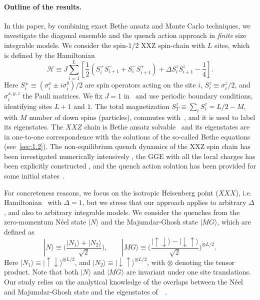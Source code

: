 \documentclass[11pt]{iopart}
\begin{document}
\paragraph*{Outline of the results.} 
In this paper, by combining exact Bethe ansatz and Monte Carlo techniques, we investigate 
the diagonal ensemble and the quench action approach in {\it finite} size integrable models. 
%
We consider the spin-$1/2$ XXZ spin-chain with $L$ sites, which is defined by the Hamiltonian 
%
\begin{equation}
\label{xxx-ham}
{\mathcal H}\equiv J\sum\limits_{i=1}^L\left[\frac{1}{2}(S_i^+S^-_{i+1} 
+S_i^{-}S_{i+1}^+)+\Delta S_i^zS_{i+1}^z-\frac{1}{4}\right].
\end{equation}
%
Here $S^{\pm}_i\equiv (\sigma_i^x\pm i\sigma_i^y)/2$ are spin operators acting on the 
site $i$, $S_i^z\equiv\sigma_i^z/2$, and $\sigma^{x,y,z}_i$ the Pauli matrices. We 
fix $J=1$ in~ and use periodic boundary conditions, identifying sites 
$L+1$ and $1$. The total magnetization $S_{T}^z\equiv\sum_iS_i^z=L/2-M$, with $M$ number 
of down spins (particles), commutes with~, and it is used to label its 
eigenstates. The $XXZ$ chain is Bethe ansatz solvable~\cite{bethe-1931,kor-book} and its eigenstates 
are in one-to-one correspondence with the solutions of the so-called Bethe equations 
(see~\ref{sec:1.2}). 
%
The non-equilibrium quench dynamics of the XXZ spin chain has been investigated 
numerically intensively \cite{dmcf-06,bar-09,krs-12,cbp-13,cce-15,fagotti-2014}, the GGE with all the 
local charges has been explicitly constructed \cite{fagotti-2014,pozsgay-2013,fagotti-2013b}, 
and the quench action solution has been provided for some initial states~\cite{pozsgay-2014A,wouters-2014A}. 

For concreteness reasons, we focus on the isotropic Heisenberg point ($XXX$), i.e. 
Hamiltonian~ with $\Delta=1$, but we stress that our approach applies to arbitrary 
$\Delta$, and  also to arbitrary integrable models. We consider the quenches from the zero-momentum 
N\'eel state $|N\rangle$ and the Majumdar-Ghosh state $|MG\rangle$, which are defined as  
%
\begin{equation}
\label{psi0}
|N\rangle\equiv\Big(\frac{|N_1\rangle
+|N_2\rangle}{\sqrt{2}}\Big), \qquad 
|MG\rangle\equiv \Big(\frac{|\uparrow\downarrow\rangle-|\downarrow\uparrow\rangle}
{\sqrt{2}}\Big)^{\otimes L/2}. 
\end{equation}
%
Here $|N_1\rangle\equiv |\uparrow\downarrow\rangle^{\otimes L/2}$, and $|N_2\rangle
\equiv |\downarrow\uparrow\rangle^{\otimes L/2}$, with $\otimes$ denoting the tensor 
product. Note that both $|N\rangle$ and $|MG\rangle$ are invariant under one site 
translations. Our study relies on the analytical knowledge of the overlaps between 
the N\'eel and Majumdar-Ghosh state and the eigenstates of~~\cite{
brockmann-2014,brockmann-2014b,brockmann-2014c,pozsgay-2014a,piroli-2014,mazza-2015}. 
\end{document}
